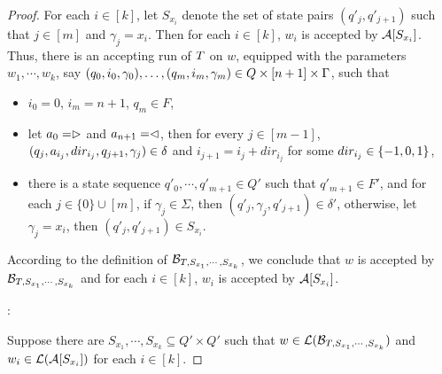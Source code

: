 \begin{proof}
For each $i \in [k]$, let $S_{x_i}$ denote the set of state pairs $(q'_j, q'_{j+1})$ such that $j \in [m]$ and $\gamma_j  = x_i$. Then for each $i \in [k]$, $w_i$ is accepted by $\mathcal{A}[S_{x_i}]$.  Thus, 
there is an accepting run of $T$ on $w$, equipped with the parameters $w_1,\cdots, w_k$, say $(q_0, i_0, \gamma_0),\ldots, (q_m, i_m, \gamma_m) \in Q \times [n+1] \times \Gamma$, such that 
%
\begin{itemize}
\item $i_0=0$, $i_m = n+1$, $q_m \in F$,
%
\item let $a_0 = \vartriangleright$ and $a_{n+1} = \vartriangleleft$,  then for every $j \in [m-1]$, $(q_j, a_{i_j}, dir_{i_j}, q_{j+1}, \gamma_j) \in
        \delta$ and $i_{j+1} = i_j + dir_{i_j}$ for some $dir_{i_j} \in \{-1, 0, 1\}$, 
 \item  there is a state sequence $q'_0, \cdots, q'_{m+1} \in Q'$ such that $q'_{m+1} \in F'$, and for each $j \in \{0\} \cup [m]$, if $\gamma_j \in \Sigma$, then $(q'_j, \gamma_j, q'_{j+1}) \in \delta'$, otherwise, let $\gamma_j =x_i$, then $(q'_j, q'_{j+1}) \in S_{x_i}$.
\end{itemize}

According to the definition of $\mathcal{B}_{T, S_{x_1}, \cdots, S_{x_k}}$, we conclude that $w$ is accepted by $\mathcal{B}_{T, S_{x_1}, \cdots, S_{x_k}}$ and for each $i \in [k]$, $w_i $ is accepted by $\mathcal{A}[S_{x_i}]$.

\smallskip

: 

\smallskip

Suppose there are $S_{x_1},\cdots, S_{x_k} \subseteq Q' \times Q'$ such that $w \in \mathcal{L}(\mathcal{B}_{T, S_{x_1}, \cdots, S_{x_k}})$ and $w_i \in \mathcal{L}(\mathcal{A}[S_{x_i}])$ for each $i \in [k]$. 


\end{proof}
